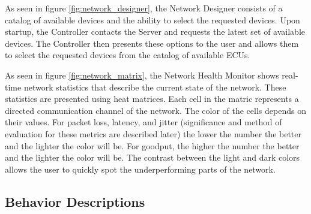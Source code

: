 \documentclass[letterpaper,twocolumn,12pt]{article}
\begin{document}
As seen in figure \ref{fig:network_designer}, the Network Designer consists of a catalog of available devices and the ability to select the requested devices. Upon startup, the Controller contacts the Server and requests the latest set of available devices. The Controller then presents these options to the user and allows them to select the requested devices from the catalog of available ECUs.


As seen in figure \ref{fig:network_matrix}, the Network Health Monitor shows real-time network statistics that describe the current state of the network. These statistics are presented using heat matrices. Each cell in the matric represents a directed communication channel of the network. The color of the cells depends on their values. For packet loss, latency, and jitter (significance and method of evaluation for these metrics are described later) the lower the number the better and the lighter the color will be. For goodput, the higher the number the better and the lighter the color will be. The contrast between the light and dark colors allows the user to quickly spot the underperforming parts of the network.

\subsection{Behavior Descriptions}
\end{document}
